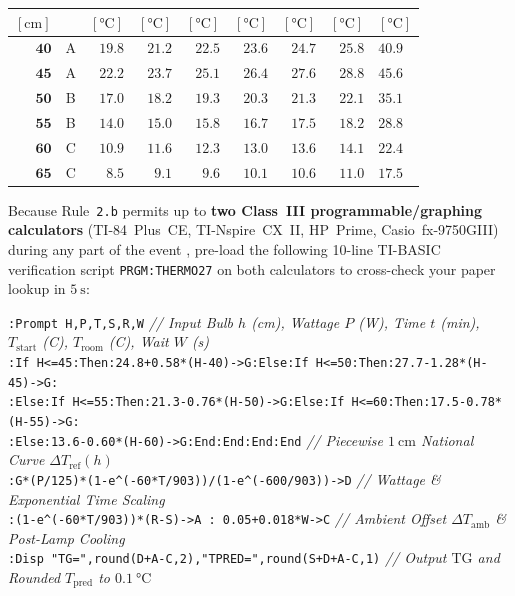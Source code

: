 \begin{twocol}[0.49]
\begin{tabularx}{\linewidth}{@{}rcrrrrrr>{\raggedright\arraybackslash}X@{}}
\tiny$[\si{\centi\meter}]$ & & \tiny$[\si{\celsius}]$ & \tiny$[\si{\celsius}]$ & \tiny$[\si{\celsius}]$ & \tiny$[\si{\celsius}]$ & \tiny$[\si{\celsius}]$ & \tiny$[\si{\celsius}]$ & \tiny$[\si{\celsius}]$ \\
\midrule
$\mathbf{40}$ & A & $19.8$ & $21.2$ & $22.5$ & $23.6$ & $24.7$ & $25.8$ & $40.9$ \\
\rowcolor{rowalt}$\mathbf{45}$ & A & $\mathbf{22.2}$ & $\mathbf{23.7}$ & $\mathbf{25.1}$ & $\mathbf{26.4}$ & $\mathbf{27.6}$ & $\mathbf{28.8}$ & $45.6$ \\
$\mathbf{50}$ & B & $17.0$ & $18.2$ & $19.3$ & $20.3$ & $21.3$ & $22.1$ & $35.1$ \\
\rowcolor{rowalt}$\mathbf{55}$ & B & $14.0$ & $15.0$ & $15.8$ & $16.7$ & $17.5$ & $18.2$ & $28.8$ \\
$\mathbf{60}$ & C & $10.9$ & $11.6$ & $12.3$ & $13.0$ & $13.6$ & $14.1$ & $22.4$ \\
\rowcolor{rowalt}$\mathbf{65}$ & C & $8.5$ & $9.1$ & $9.6$ & $10.1$ & $10.6$ & $11.0$ & $17.5$ \\
\bottomrule
\end{tabularx}
\end{twocol}

\begin{devicebox}
Because Rule~\texttt{2.b} permits up to \textbf{two Class~III programmable/graphing calculators} (TI-84~Plus~CE, TI-Nspire~CX~II, HP~Prime, Casio~fx-9750GIII) during any part of the event , pre-load the following 10-line TI-BASIC verification script \texttt{PRGM:THERMO27} on both calculators to cross-check your paper lookup in $\SI{5}{\second}$:
\par\smallskip\noindent
\texttt{:Prompt H,P,T,S,R,W} \hfill {\footnotesize\textit{// Input Bulb $h$ (cm), Wattage $P$ (W), Time $t$ (min), $T_{\mathrm{start}}$ (C), $T_{\mathrm{room}}$ (C), Wait $W$ (s)}} \\
\texttt{:If H<=45:Then:24.8+0.58*(H-40)->G:Else:If H<=50:Then:27.7-1.28*(H-45)->G:} \\
\texttt{:Else:If H<=55:Then:21.3-0.76*(H-50)->G:Else:If H<=60:Then:17.5-0.78*(H-55)->G:} \\
\texttt{:Else:13.6-0.60*(H-60)->G:End:End:End:End} \hfill {\footnotesize\textit{// Piecewise $\SI{1}{\centi\meter}$ National Curve $\Delta T_{\mathrm{ref}}(h)$}} \\
\texttt{:G*(P/125)*(1-e\^{}(-60*T/903))/(1-e\^{}(-600/903))->D} \hfill {\footnotesize\textit{// Wattage \& Exponential Time Scaling}} \\
\texttt{:(1-e\^{}(-60*T/903))*(R-S)->A : 0.05+0.018*W->C} \hfill {\footnotesize\textit{// Ambient Offset $\Delta T_{\mathrm{amb}}$ \& Post-Lamp Cooling}} \\
\texttt{:Disp "TG=",round(D+A-C,2),"TPRED=",round(S+D+A-C,1)} \hfill {\footnotesize\textit{// Output $\mathrm{TG}$ and Rounded $T_{\mathrm{pred}}$ to $\SI{0.1}{\celsius}$}}
\end{devicebox}

